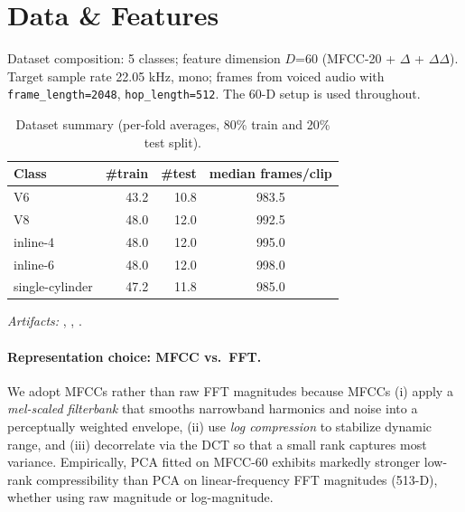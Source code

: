 \documentclass[11pt]{article}
\newcommand{\D}{\ensuremath{D}\xspace}
\begin{document}
\section{Data \& Features}

Dataset composition: 5 classes; feature dimension \D=\num{60} (MFCC-20 + $\Delta$ + $\Delta\Delta$). Target sample rate 22.05 kHz, mono; frames from voiced audio with \texttt{frame\_length=2048}, \texttt{hop\_length=512}. The 60-D setup is used throughout.

\begin{table}[!htbp]
\caption{Dataset summary (per-fold averages, 80\% train and 20\% test split).}
\label{tab:data}
\centering
\begin{tabular}{lrrc}
\toprule
\textbf{Class} & \textbf{\#train} & \textbf{\#test} & \textbf{median frames/clip} \\
\midrule
V6               & 43.2 & 10.8 & 983.5 \\
V8               & 48.0 & 12.0 & 992.5 \\
inline-4         & 48.0 & 12.0 & 995.0 \\
inline-6         & 48.0 & 12.0 & 998.0 \\
single-cylinder  & 47.2 & 11.8 & 985.0 \\
\bottomrule
\end{tabular}
\end{table}

\noindent\emph{Artifacts:} , , .

\paragraph{Representation choice: MFCC vs.\ FFT.}
We adopt MFCCs rather than raw FFT magnitudes because MFCCs (i) apply a \emph{mel-scaled filterbank} that smooths narrowband harmonics and noise into a perceptually weighted envelope, (ii) use \emph{log compression} to stabilize dynamic range, and (iii) decorrelate via the DCT so that a small rank captures most variance. Empirically, PCA fitted on MFCC-60 exhibits markedly stronger low-rank compressibility than PCA on linear-frequency FFT magnitudes (513-D), whether using raw magnitude or log-magnitude.
\end{document}
